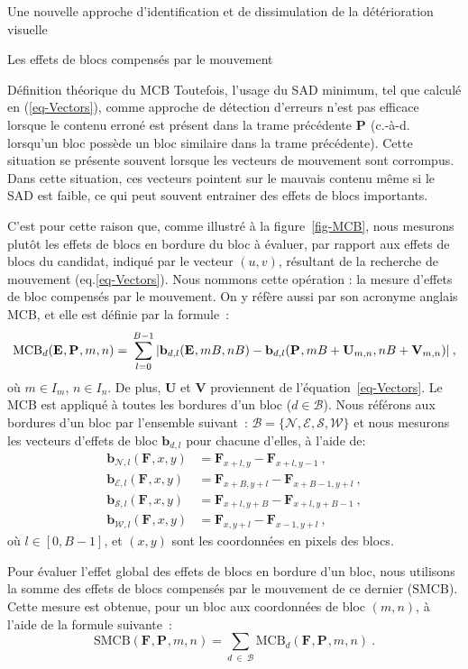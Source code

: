 \documentclass[letterpaper, twoside, 12pt,memoire]{thETS}
\newcommand{\fig}[1]{figure~\ref{#1}}
\newcommand{\ltF}[1]{\mathbf{F}_{#1}}
\newcommand{\ltE}[1]{\mathbf{E}_{#1}}
\newcommand{\ltP}[1]{\mathbf{P}_{#1}}
\newcommand{\ltS}[1]{I_{#1}}
\newcommand{\lttBLK}[2]{\textrm{MCB}_{#1}(#2)}
\newcommand{\ltCB}[2]{\mathbf{b}_{#1}(#2)}
\newcommand{\ltSTBLK}[1]{\textrm{SMCB}(#1)}
\newcommand{\ltBor}[1]{\mathcal{#1}}
\begin{document}
\begin{chapter}{Une nouvelle approche d'identification et de dissimulation de la
détérioration visuelle}
\begin{section}{Les effets de blocs compensés par le mouvement}
\begin{subsection}{Définition théorique du MCB}
Toutefois, l'usage du SAD minimum, tel que calculé en (\ref{eq-Vectors}), comme approche de détection d'erreurs n'est pas efficace lorsque le contenu erroné est présent dans la trame précédente $\ltP{}$ (c.-à-d. lorsqu'un bloc possède un bloc similaire dans la trame précédente). Cette situation se présente souvent lorsque les vecteurs de mouvement sont corrompus. Dans cette
situation, ces vecteurs pointent sur le mauvais contenu même si le SAD est faible, ce qui peut souvent
entrainer des effets de blocs importants.

C'est pour cette raison que, comme illustré à la \fig{fig-MCB}, nous mesurons plutôt
les effets de blocs en bordure du bloc à évaluer, par rapport aux effets de
blocs du candidat, indiqué par le vecteur $(u,v)$, résultant de la recherche de
mouvement (eq.\ref{eq-Vectors}). Nous nommons cette opération : la mesure
d'effets de bloc compensés par le mouvement. On y réfère aussi par son acronyme
anglais MCB, et elle est définie par la formule~:
\begin{equation}
\label{eq-blk}
\lttBLK{d}{\ltE{},\ltP{}, m,n} = \\ \sum_{l = 0}^{B-1} | \ltCB{d,l}{\ltE{},m B,n
B} - \ltCB{d, l}{\ltP{},m B+\mathbf{U}_{m, n}, n B +\mathbf{V}_{m, n}} |\:,
\end{equation}
où \mbox{$m \in \ltS{m}$}, \mbox{$n \in \ltS{n}$}. De plus, $\mathbf{U}$ et
$\mathbf{V}$ proviennent de l'équation~\eqref{eq-Vectors}. Le MCB est appliqué à
toutes les bordures d'un bloc ($d \in \mathcal{B}$). Nous référons aux bordures
d'un bloc par l'ensemble suivant~: $\mathcal{B}=\{\ltBor{N}, \ltBor{E},
\ltBor{S}, \ltBor{W}\}$ et nous mesurons les vecteurs d'effets de bloc
$\mathbf{b}_{d, l}$ pour chacune d'elles, à l'aide de:
\begin{align}
\ltCB{\ltBor{N}, l}{\ltF{}, x,y} &= \ltF{x+l,y} - \ltF{x+l,y-1}\:, \\
\ltCB{\ltBor{E}, l}{\ltF{}, x,y} &= \ltF{x+B,y+l} - \ltF{x+B-1,y+l}\:, \\
\ltCB{\ltBor{S}, l}{\ltF{}, x,y} &= \ltF{x+l,y+B} - \ltF{x+l,y+B-1}\:, \\
\ltCB{\ltBor{W}, l}{\ltF{}, x,y} &= \ltF{x,y+l} - \ltF{x-1,y+l}\:,
\end{align}
où $l \in [0, B-1]$, et $(x,y)$ sont les
coordonnées en pixels des blocs.

Pour évaluer l'effet global des effets de blocs en bordure d'un bloc, nous utilisons la somme des effets de blocs compensés par
le mouvement de ce dernier ($\textrm{SMCB}$). Cette mesure est obtenue, pour un
bloc aux coordonnées de bloc $(m,n)$, à l'aide de la formule suivante~:
\begin{equation}
\label{eq-SumTB}
\ltSTBLK{\ltF{},\ltP{}, m,n} =
\sum_{d\:\in\:\mathcal{B}}\lttBLK{d}{\ltF{},\ltP{},m,n}\:.
\end{equation}


\end{subsection}
\end{section}
\end{chapter}
\end{document}
